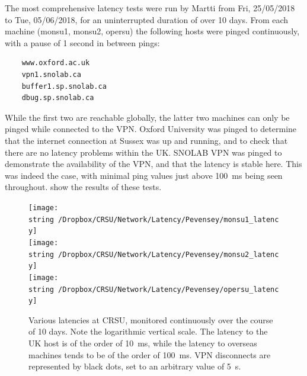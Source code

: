 \documentclass[a4paper,10pt]{article}
\begin{document}
% 

The most comprehensive latency tests were run by Martti from Fri, 25/05/2018 to Tue, 05/06/2018, for an uninterrupted duration of over 10 days. From each machine (monsu1, monsu2, opersu) the following hosts were pinged continuously, with a pause of 1 second in between pings:
\begin{Verbatim}
	www.oxford.ac.uk
	vpn1.snolab.ca
	buffer1.sp.snolab.ca
	dbug.sp.snolab.ca
\end{Verbatim}
While the first two are reachable globally, the latter two machines can only be pinged while connected to the VPN.
Oxford University was pinged to determine that the internet connection at Sussex was up and running, and to check that there are no latency problems within the UK.
SNOLAB VPN was pinged to demonstrate the availability of the VPN, and that the latency is stable here. This was indeed the case, with minimal ping values just above 100~ms being seen throughout.
 show the results of these tests.

\begin{figure}[htp]
	\centering
	\texttt{[image: \\string~/Dropbox/CRSU/Network/Latency/Pevensey/monsu1\_latency]}\\
	\texttt{[image: \\string~/Dropbox/CRSU/Network/Latency/Pevensey/monsu2\_latency]}\\
	\texttt{[image: \\string~/Dropbox/CRSU/Network/Latency/Pevensey/opersu\_latency]}
	\caption{Various latencies at CRSU, monitored continuously over the course of 10 days. Note the logarithmic vertical scale. The latency to the UK host is of the order of 10~ms, while the latency to overseas machines tends to be of the order of 100~ms. VPN disconnects are represented by black dots, set to an arbitrary value of 5~s.}
	\label{latency_final_1}
\end{figure}
\end{document}
